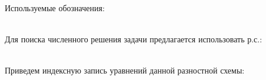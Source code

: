 Используемые обозначения:
\begin{figure}[h!]
\end{figure} \\
Для поиска численного решения задачи предлагается использовать р.с.:
\begin{figure}[h!]
\end{figure} 
\begin{figure}[h!]
\end{figure} \\
\newpage
Приведем индексную запись уравнений данной разностной схемы:
\begin{figure}[h!]
\end{figure}
\begin{figure}[h!]
\end{figure}
